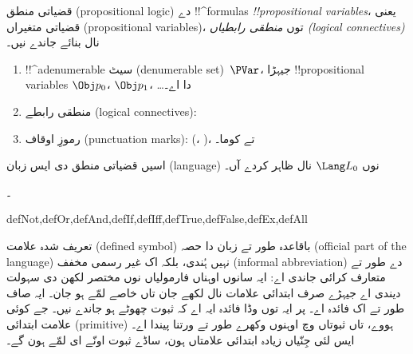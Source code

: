 \documentclass[../../../include/open-logic-section]{subfiles}
\begin{document}


قضیاتی منطق (propositional logic) دے !!^{formula}s
\emph{!!{propositional
    variable}s}، یعنی قضیاتی متغیراں (propositional variables)، توں
\emph{منطقی رابطیاں (logical connectives)} نال بنائے جاندے نیں۔

\begin{enumerate}
\item !!^a{denumerable} سیٹ (denumerable set)~$\PVar$، جیہڑا
  !!{propositional variable}s
  $\Obj p_0$، $\Obj p_1$، \dots دا اے۔
\item منطقی رابطے (logical connectives):
  \startycommalist
\item رموزِ اوقاف (punctuation marks): (، )، تے کوما۔
\end{enumerate}

اسیں قضیاتی منطق دی ایس زبان (language) نوں $\Lang L_0$ نال ظاہر کردے
آں۔

۔

\begin{tagblock}{defNot,defOr,defAnd,defIf,defIff,defTrue,defFalse,defEx,defAll}
\begin{explain}
تعریف شدہ علامت (defined symbol) باقاعدہ طور تے زبان دا حصہ (official
part of the language) نہیں ہُندی، بلکہ اک غیر رسمی مخفف (informal
abbreviation) دے طور تے متعارف کرائی جاندی اے: ایہ سانوں اوہناں فارمولیاں نوں
مختصر لکھن دی سہولت دیندی اے جیہڑے صرف ابتدائی علامات نال لکھے جان تاں
خاصے لمّے ہو جان۔ ایہ صاف طور تے اک فائدہ اے۔ پر ایہ توں وڈا فائدہ ایہ
اے کہ ثبوت چھوٹے ہو جاندے نیں۔ جے کوئی علامت ابتدائی (primitive) ہووے،
تاں ثبوتاں
وچ اوہنوں وکھرے طور تے ورتنا پیندا اے۔ ایس لئی جِنّیاں زیادہ ابتدائی
علامتاں ہون، ساڈے ثبوت اونّے ای لمّے ہون گے۔
\end{explain}
\end{tagblock}
\end{document}
